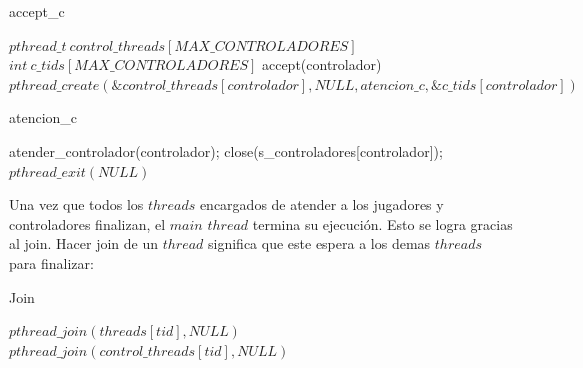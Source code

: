 \begin{algorithm}[H]
\caption{accept\_c}\label{ej1}
\begin{algorithmic}[1]
	\State $pthread\_t \ control\_threads[MAX\_CONTROLADORES]$
	\State $int \ c\_tids[MAX\_CONTROLADORES]$
		\State accept(controlador)
		\State $pthread\_create(\&control\_threads[controlador],NULL,atencion\_c,\&c\_tids[controlador])$
	\EndFor
\EndProcedure
\end{algorithmic}
\end{algorithm}

\begin{algorithm}[H]
\caption{atencion\_c}\label{ej1}
\begin{algorithmic}[1]
	\State atender\_controlador(controlador);
	\State close(s\_controladores[controlador]);
	\State $pthread\_exit(NULL)$
\EndProcedure
\end{algorithmic}
\end{algorithm}

Una vez que todos los $threads$ encargados de atender a los jugadores y controladores finalizan, el $main$ $thread$ termina su ejecución. Esto se logra gracias al join. Hacer join de un $thread$ significa que este espera a los demas $threads$ para finalizar:

\begin{algorithm}[H]
\caption{Join}\label{ej1}
\begin{algorithmic}[1]
		\State $pthread\_join(threads[tid], NULL)$
	\EndFor
		\State $pthread\_join(control\_threads[tid], NULL)$
	\EndFor
\EndProcedure
\end{algorithmic}
\end{algorithm}
